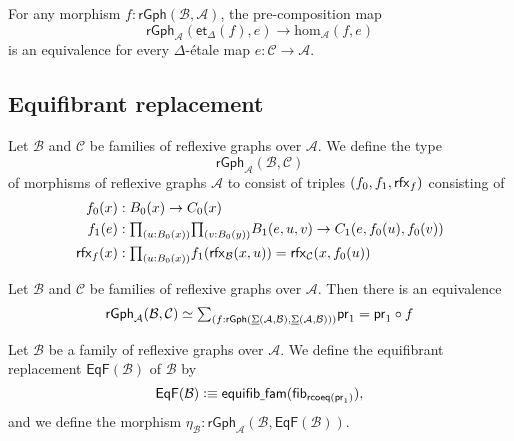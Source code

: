 \begin{thm}
For any morphism $f:\mathsf{rGph}(\mathcal{B},\mathcal{A})$, the pre-composition map
\begin{equation*}
\mathsf{rGph}_{\mathcal{A}}(\mathsf{et}_\Delta(f),e)\to \mathrm{hom}_{\mathcal{A}}(f,e)
\end{equation*}
is an equivalence for every $\Delta$-\'etale map $e:\mathcal{C}\to\mathcal{A}$.
\end{thm}

\subsection{Equifibrant replacement}

\begin{defn}
Let $\mathcal{B}$ and $\mathcal{C}$ be families of reflexive graphs over $\mathcal{A}$. We define the type
\begin{equation*}
\mathsf{rGph}_{\mathcal{A}}(\mathcal{B},\mathcal{C})
\end{equation*}
of morphisms of reflexive graphs  $\mathcal{A}$ to consist of triples $(\pts{f},\edg{f},\rfx{f})$ consisting of
\begin{align*}
\pts{f}(x) & : \pts{B}(x)\to \pts{C}(x) \\
\edg{f}(e) & : \prd{u:\pts{B}(x)}{v:\pts{B}(y)} \edg{B}(e,u,v)\to \edg{C}(e,\pts{f}(u),\pts{f}(v)) \\
\rfx{f}(x) & : \prd{u:\pts{B}(x)} \edg{f}(\rfx{\mathcal{B}}(x,u))=\rfx{\mathcal{C}}(x,\pts{f}(u))
\end{align*}
\end{defn}

\begin{lem}
Let $\mathcal{B}$ and $\mathcal{C}$ be families of reflexive graphs over $\mathcal{A}$. Then there is an equivalence
\begin{equation*}
\eqv{\mathsf{rGph}_{\mathcal{A}}(\mathcal{B},\mathcal{C})}{\sm{f:\mathsf{rGph}(\msm{\mathcal{A}}{\mathcal{B}},\msm{\mathcal{A}}{\mathcal{B}})} \proj 1 = \proj 1 \circ f}
\end{equation*}
\end{lem}

\begin{defn}
Let $\mathcal{B}$ be a family of reflexive graphs over $\mathcal{A}$. We define the equifibrant replacement $\mathsf{EqF}(\mathcal{B})$ of $\mathcal{B}$ by
\begin{equation*}
\mathsf{EqF}(\mathcal{B}) \vcentcolon\equiv \mathsf{equifib\underline{\ }{}fam}(\mathsf{fib}_{\mathsf{rcoeq}(\mathsf{pr}_{1})}),
\end{equation*}
and we define the morphism $\eta_{\mathcal{B}}:\mathsf{rGph}_{\mathcal{A}}(\mathcal{B},\mathsf{EqF}(\mathcal{B}))$. 
\end{defn}

